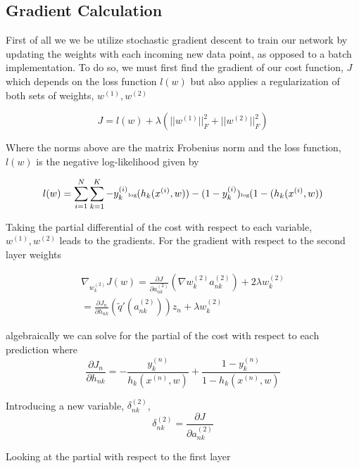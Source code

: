 \documentclass[12pt, twocolumn]{article}
\begin{document}
\subsection{Gradient Calculation}
First of all we we be utilize stochastic gradient descent to train our network by updating the weights with each incoming new data point, as opposed to a batch implementation. To do so,  we must first find the gradient of our cost function, $J$ which depends on the loss function $l(w)$ but also applies a regularization of both sets of weights, $w^{(1)}, w^{(2)}$

\begin{equation}
J= l(w) + \lambda ( ||w^{(1)}||^2_F +||w^{(2)}||^2_F)
\end{equation}

Where the norms above are the matrix Frobenius norm and the loss function, $l(w)$ is the  negative log-likelihood given by 

\begin{equation}
\tiny
l(w)= \sum_{i=1}^N \sum_{k=1}^K -y^{(i)}_k \textrm{log}(h_k(x^{(i)}, w)) - (1 -y^{(i)}_k) \textrm{log}(1 -(h_k(x^{(i)}, w))
\end {equation}


Taking the partial differential of the cost with respect to each variable, $w^{(1)},w^{(2)}$ leads to the gradients. For the gradient with respect to the second layer weights 

\begin{align}
\nabla_{w_k^{(2)}} J (w)= \frac{\partial J}{\partial a^{(2)}_{nk}}  (\nabla w_k^{(2)} a_{nk}^{(2)})  +2 \lambda w_k^{(2)} \\
=\frac{\partial J_n}{\partial h_{nk}} (\tilde{q}' (a_{nk}^{(2)}))z_n + \lambda w_k^{(2)}
\end{align}


algebraically we can solve for the partial of the cost with respect to each prediction where  
\begin{equation}
\frac{\partial J_n}{\partial h_{nk}}= -\frac{y_k^{(n)}}{h_k(x^{(n)},w)} + \frac{1- y_k^{(n)}}{1 - h_k(x^{(n)},w)}
\end{equation}

 Introducing a new variable, $\delta_{nk}^{(2)}$, 
\begin{equation}
\delta_{nk}^{(2)}=\frac{\partial J}{\partial a^{(2)}_{nk}} 
\end{equation}


Looking at the partial with respect to the first layer 
\end{document}
